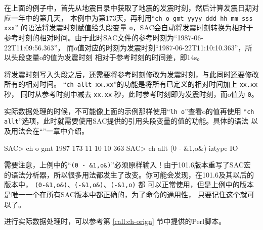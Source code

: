 在上面的例子中，首先从地震目录中获取了地震的发震时刻，然后计算发震日期对应一年中的第几天，
本例中为第173天，再利用``\texttt{ch o gmt yyyy ddd hh mm sss xxx}''
的语法将发震时刻赋值给头段变量 \texttt{o}，SAC会自动将发震时刻转换为相对于
参考时刻的相对时间。由于此时SAC文件的参考时刻为``1987-06-22T11:09:56.363''，
而o值对应的时刻为发震时刻``1987-06-22T11:10:10.363''，所以头段变量o的值为发震时刻
相对于参考时刻的时间差，即14s。

将发震时刻写入头段之后，还需要将参考时刻修改为发震时刻，与此同时还要修改所有的相对时间。
``\texttt{ch allt xx.xx}''的功能是将所有已定义的相对时间加上 \texttt{xx.xx} 秒，
同时从参考时刻中减去 \texttt{xx.xx} 秒，此时参考时刻即为发震时刻，而o值为 \texttt{0}。

实际数据处理的时候，不可能像上面的示例那样使用``\texttt{lh o}''查看o的值再使用
``\texttt{ch allt}''选项，此时就需要使用SAC提供的引用头段变量的值的功能。具体的语法
以及用法会在``''一章中介绍。

\begin{SACCode}
SAC> ch o gmt 1987 173 11 10 10 363
SAC> ch allt (0 - &1,o&) iztype IO
\end{SACCode}

需要注意，上例中的``\verb|(0 - &1,o&)|''必须原样输入！由于101.6版本重写了SAC宏
的语法分析器，所以很多用法都发生了改变。你可能会发现，在101.6及其以后的版本中，
\verb|(0-&1,o&)|、\verb|(-&1,o&)|、\verb|(-&1,o)| 都
可以正常使用，但是上例中的版本是唯一一个在所有SAC版本中都正确的，为了命令的通用性，
只要记住这个就可以了。

进行实际数据处理时，可以参考第 \ref{call:ch-orign} 节中提供的Perl脚本。
